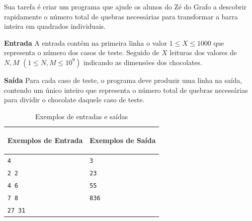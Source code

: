 Sua tarefa é criar um programa que ajude os alunos do Zé do Grafo a descobrir rapidamente o número total de quebras necessárias para transformar a barra inteira em quadrados individuais.

\vspace{0.3cm}
\textbf{Entrada}
A entrada contém  na primeira linha o valor $1 \leq X \leq 1000$ que representa o número dos casos de teste. Seguido de $X$ leituras dos valores de $N,M$ $(1 \leq N,M \leq 10^9)$ indicando as dimensões dos chocolates. 


\vspace{0.3cm}
\textbf{Saída}
Para cada caso de teste, o programa deve produzir uma linha na saída, contendo um único inteiro que representa o número total de quebras necessárias para dividir o chocolate daquele caso de teste.

{\tiny
\begin{table}[h]
    \centering
    \begin{tabular}{|p{7cm}|p{7cm}|}
        \hline
        \begin{center}
            \vspace{-0.3cm}
            \textbf{Exemplos de Entrada}
            \vspace{-0.3cm}
        \end{center} 
         &  
        \begin{center}
            \vspace{-0.3cm}
            \textbf{Exemplos de Saída}
            \vspace{-0.3cm}
        \end{center} \\ \hline
         \texttt{4} & \texttt{3} \\  
         \texttt{2 2} & \texttt{23} \\
         \texttt{4 6} & \texttt{55} \\
         \texttt{7 8} & \texttt{836} \\
         \texttt{27 31} & \texttt{} \\
        \hline
    \end{tabular}
    \caption{Exemplos de entradas e saídas}
\end{table}}

\newpage

\begin{center}
\noindent

\end{center}
